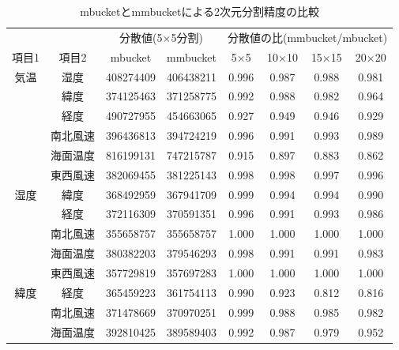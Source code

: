 \begin{table}[hbt]
\begin{center}
\caption{mbucketとmmbucketによる2次元分割精度の比較\label{tbl:mmbucket_table1}}
{\footnotesize
\begin{tabular}{c|c||c|c|c|c|c|c}
\hline
            &          & \multicolumn{2}{|c|}{分散値(5×5分割)} & \multicolumn{4}{|c}{分散値の比(mmbucket/mbucket)} \\  \cline{3-4}  \cline{5-8}
項目1       & 項目2    & mbucket  & mmbucket & 5×5  &10×10 &15×15 & 20×20\\ \hline\hline
気温        & 湿度     &408274409 &406438211 &0.996 &0.987 &0.988 &0.981 \\
            & 緯度     &374125463 &371258775 &0.992 &0.988 &0.982 &0.964 \\
            & 経度     &490727955 &454663065 &0.927 &0.949 &0.946 &0.929 \\
            & 南北風速 &396436813 &394724219 &0.996 &0.991 &0.993 &0.989 \\
            & 海面温度 &816199131 &747215787 &0.915 &0.897 &0.883 &0.862 \\
            & 東西風速 &382069455 &381225143 &0.998 &0.998 &0.997 &0.996 \\  \hline
湿度        & 緯度     &368492959 &367941709 &0.999 &0.994 &0.994 &0.990 \\
            & 経度     &372116309 &370591351 &0.996 &0.991 &0.993 &0.986 \\
            & 南北風速 &355658757 &355658757 &1.000 &1.000 &1.000 &1.000 \\
            & 海面温度 &380382203 &379546293 &0.998 &0.991 &0.991 &0.983 \\
            & 東西風速 &357729819 &357697283 &1.000 &1.000 &1.000 &1.000 \\ \hline
緯度        & 経度     &365459223 &361754113 &0.990 &0.923 &0.812 &0.816 \\
            & 南北風速 &371478669 &370970251 &0.999 &0.988 &0.985 &0.982 \\
            & 海面温度 &392810425 &389589403 &0.992 &0.987 &0.979 &0.952 \\

\end{tabular}}
\end{center}
\end{table}
